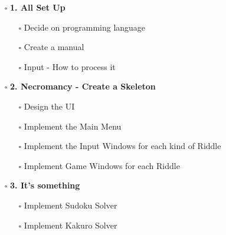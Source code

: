 \documentclass{article}
\begin{document}
	\begin{minipage}[t]{0.45\textwidth}
		\strut\vspace*{-\baselineskip}\newline
		\begin{itemize}
			\item[$\square$] \textbf{1. All Set Up}
			\begin{itemize}
				\item[\rlap{\checkmark}$\square$] Decide on programming language
				\item[$\square$] Create a manual
				
				\item[$\square$] Input - How to process it
			\end{itemize}
			\item[$\square$] \textbf{2. Necromancy - Create a Skeleton}
			\begin{itemize}
				\item[$\square$] Design the UI
				\item[$\square$] Implement the Main Menu
				\item[$\square$] Implement the Input Windows for each kind of Riddle
				\item[$\square$] Implement Game Windows for each Riddle
			\end{itemize}
			\item[$\square$] \textbf{3. It's something}
			\begin{itemize}
				\item[$\square$] Implement Sudoku Solver
				\item[$\square$] Implement Kakuro Solver
			\end{itemize}
		\end{itemize}
	\end{minipage}
	\hspace*{.1\textwidth}
\end{document}
